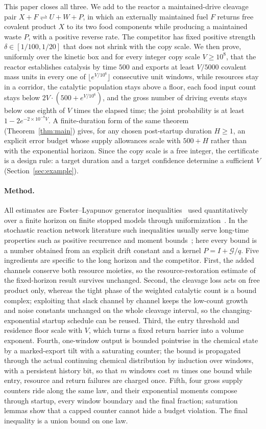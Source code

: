 \documentclass[11pt,a4paper]{article}
\theoremstyle{plain}
\theoremstyle{definition}
\theoremstyle{remark}
\newcommand{\G}{\mathcal G}
\begin{document}
This paper closes all three. We add to the reactor a maintained-drive cleavage pair $X+F\rightleftharpoons U+W+P$, in which an externally maintained fuel $F$ returns free covalent product $X$ to its two food components while producing a maintained waste $P$, with a positive reverse rate. The competitor has fixed positive strength $\delta\in[1/100,1/20]$ that does not shrink with the copy scale. We then prove, uniformly over the kinetic box and for every integer copy scale $V\ge10^8$, that the reactor establishes catalysis by time $500$ and exports at least $V/5000$ covalent mass units in every one of $\lfloor e^{V/10^6}\rfloor$ consecutive unit windows, while resources stay in a corridor, the catalytic population stays above a floor, each food input count stays below $2V\cdot(500+e^{V/10^6})$, and the gross number of driving events stays below one eighth of $V$ times the elapsed time; the joint probability is at least $1-2e^{-2\times10^{-8}V}$. A finite-duration form of the same theorem (Theorem~\ref{thm:main}) gives, for any chosen post-startup duration $H\ge1$, an explicit error budget whose supply allowances scale with $500+H$ rather than with the exponential horizon. Since the copy scale is a free integer, the certificate is a design rule: a target duration and a target confidence determine a sufficient $V$ (Section~\ref{sec:example}).

\paragraph{Method.}
All estimates are Foster--Lyapunov generator inequalities~\citep{meyn1993} used quantitatively over a finite horizon on finite stopped models through uniformization~\citep{jensen1953,grassmann1977}. In the stochastic reaction network literature such inequalities usually serve long-time properties such as positive recurrence and moment bounds~\citep{gupta2014,anderson2018}; here every bound is a number obtained from an explicit drift constant and a kernel $P=I+\G/q$. Five ingredients are specific to the long horizon and the competitor. First, the added channels conserve both resource moieties, so the resource-restoration estimate of the fixed-horizon result survives unchanged. Second, the cleavage loss acts on free product only, whereas the tight phase of the weighted catalytic count is a bound complex; exploiting that slack channel by channel keeps the low-count growth and noise constants unchanged on the whole cleavage interval, so the changing-exponential startup schedule can be reused. Third, the entry threshold and residence floor scale with $V$, which turns a fixed return barrier into a volume exponent. Fourth, one-window output is bounded pointwise in the chemical state by a marked-export tilt with a saturating counter; the bound is propagated through the actual continuing chemical distribution by induction over windows, with a persistent history bit, so that $m$ windows cost $m$ times one bound while entry, resource and return failures are charged once. Fifth, four gross supply counters ride along the same law, and their exponential moments compose through startup, every window boundary and the final fraction; saturation lemmas show that a capped counter cannot hide a budget violation. The final inequality is a union bound on one law.
\end{document}
